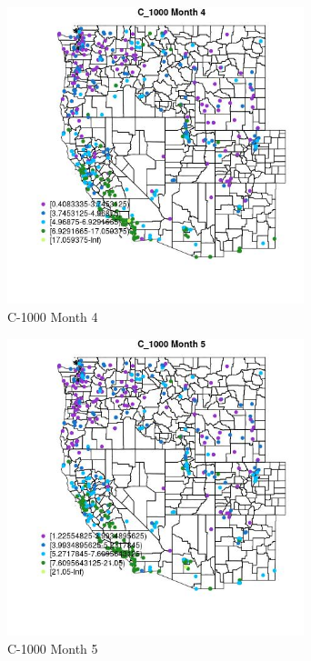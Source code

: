 \begin{figure} 
\centering  
\includegraphics[width=0.77\textwidth]{Code_Outputs/ML_input_report_ML_input_PM25_Step5_part_d_de_duplicated_aves_ML_input_MapObsMo4C_1000.jpg} 
\caption{\label{fig:ML_input_report_ML_input_PM25_Step5_part_d_de_duplicated_aves_ML_inputMapObsMo4C_1000}C-1000 Month 4} 
\end{figure} 
 

\begin{figure} 
\centering  
\includegraphics[width=0.77\textwidth]{Code_Outputs/ML_input_report_ML_input_PM25_Step5_part_d_de_duplicated_aves_ML_input_MapObsMo5C_1000.jpg} 
\caption{\label{fig:ML_input_report_ML_input_PM25_Step5_part_d_de_duplicated_aves_ML_inputMapObsMo5C_1000}C-1000 Month 5} 
\end{figure} 
 

